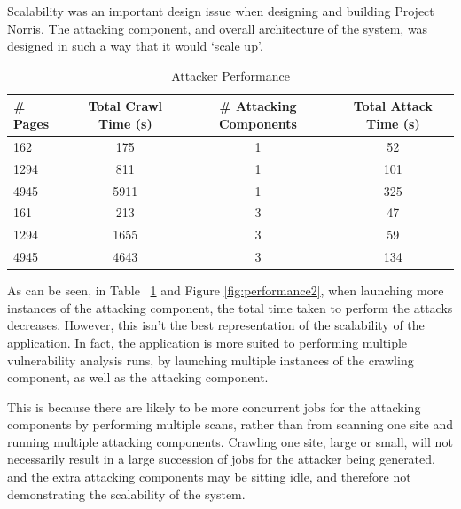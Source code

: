 \documentclass[12pt,a4paper]{article}
\begin{document}
Scalability was an important design issue when designing and building Project Norris.  The attacking component, and overall architecture of the system, was designed in such a way that it would `scale up'.

\begin{center}
    \begin{table}
        \caption{Attacker Performance}
        \begin{center}
            \begin{tabular}{ | l | c | c | c | }
                \hline
                \# Pages & Total Crawl Time (s) & \# Attacking Components & Total Attack Time (s)  \\ \hline
                162 & 175 & 1 & 52 \\ \hline
                1294 & 811 & 1 & 101 \\ \hline
                4945 & 5911 & 1 & 325 \\ \hline
                161 & 213 & 3 & 47 \\ \hline
                1294 & 1655 & 3 & 59 \\ \hline
                4945 & 4643 & 3 & 134 \\
                \hline
            \end{tabular}
        \end{center}
        \label{table:scalability}
    \end{table}
\end{center}

As can be seen, in Table ~\ref{table:scalability} and Figure \ref{fig:performance2}, when launching more instances of the attacking component, the total time taken to perform the attacks decreases.  However, this isn't the best representation of the scalability of the application.  In fact, the application is more suited to performing multiple vulnerability analysis runs, by launching multiple instances of the crawling component, as well as the attacking component.  

This is because there are likely to be more concurrent jobs for the attacking components by performing multiple scans, rather than from scanning one site and running multiple attacking components.  Crawling one site, large or small, will not necessarily result in a large succession of jobs for the attacker being generated, and the extra attacking components may be sitting idle, and therefore not demonstrating the scalability of the system.
\end{document}
